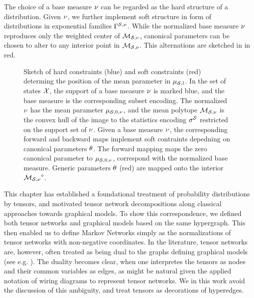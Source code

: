 The choice of a base measure $\nu$ can be regarded as the hard structure of a distribution.
Given $\nu$, we further implement soft structure in form of distributions in exponential families $\Gamma^{\mathcal{S},\nu}$.
While the normalized base measure $\nu$ reproduces only the weighted center of $\mathcal{M}_{\mathcal{S},\nu}$, canonical parameters can be chosen to alter to any interior point in $\mathcal{M}_{\mathcal{S},\nu}$. %
This alternations are sketched in  in red.

\begin{figure}
    \begin{center}
        
    \end{center}
    \caption{
        Sketch of hard constraints (blue) and soft constraints (red) determing the position of the mean parameter in $\mu_{\mathcal{S},\mathbb{I}}$.
        In the set of states $\mathcal{X}$, the support of a base measure $\nu$ is marked blue, and the base measure is the corresponding subset encoding.
        The normalized $\nu$ has the mean parameter $\mu_{\mathcal{S},0,\nu}$, and the mean polytope $\mathcal{M}_{\mathcal{S},\nu}$ is the convex hull of the image to the statistics encoding $\sigma^{\mathcal{S}}$ restricted on the support set of $\nu$.
        Given a base measure $\nu$, the corresponding forward and backward maps implement soft contraints depedning on canonical parameters $\theta$.
        The forward mapping maps the zero canonical parameter to $\mu_{\mathcal{S},0,\nu}$, correspond with the normalized base measure.
        Generic parameters $\theta$ (red) are mapped onto the interior ${\mathcal{M}_{\mathcal{S},\nu}}^{\circ}$.
    }\label{fig:hs_mean_sketch}
\end{figure}



This chapter has established a foundational treatment of probability distributions by tensors, and motivated tensor network decompositions along classical approaches towards graphical models.
To show this correspondence, we defined both tensor networks and graphical models based on the same hypergraph.
This then enabled us to define Markov Networks simply as the normalizations of tensor networks with non-negative coordinates.
In the literature, tensor networks are, however, often treated as being dual to the graphs defining graphical models (see e.g. \cite{robeva_duality_2019}).
The duality becomes clear, when one interpretes the tensors as nodes and their common variables as edges, as might be natural given the applied notation of wiring diagrams to represent tensor networks.
We in this work avoid the discussion of this ambiguity, and treat tensors as decorations of hyperedges.

